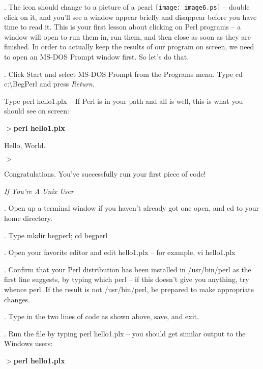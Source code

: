 \documentclass[a4paper,11pt]{book}
\begin{document}
. The icon should change to a picture of a pearl \texttt{[image: image6.ps]} -- double click on it, and you'll see a window appear briefly and disappear before you have time to read it. This is your first lesson about clicking on Perl programs -- a window will open to run them in, run them, and then close as soon as they are finished. In order to actually keep the results of our program on screen, we need to open an MS-DOS Prompt window first. So let's do that.

. Click Start and select MS-DOS Prompt from the Programs menu. Type cd c:\textbackslash BegPerl and press \textit{Return}.

\noindent 

\noindent Type perl hello1.plx -- If Perl is in your path and all is well, this is what you should see on screen:

\noindent 

\noindent $>$\textbf{perl hello1.plx}

\noindent Hello, World.

\noindent 

\noindent $>$

\noindent 

\noindent Congratulations. You've successfully run your first piece of code!

\noindent 

\noindent \textit{If You're A Unix User}

. Open up a terminal window if you haven't already got one open, and cd to your home directory.

. Type mkdir begperl; cd begperl

. Open your favorite editor and edit hello1.plx -- for example, vi hello1.plx

. Confirm that your Perl distribution has been installed in /usr/bin/perl as the first line suggests, by typing which perl -- if this doesn't give you anything, try whence perl. If the result is not /usr/bin/perl, be prepared to make appropriate changes.

. Type in the two lines of code as shown above, save, and exit.

. Run the file by typing perl hello1.plx -- you should get similar output to the Windows users:

\noindent 

\noindent $>$\textbf{perl hello1.plx}
\end{document}

